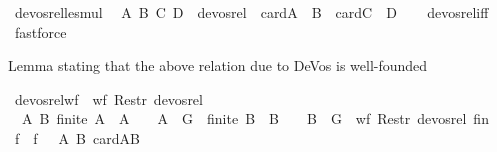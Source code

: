 \begin{isabellebody}
\endisadelimproof
\isanewline
{}\isamarkupfalse%
\ devos{\isacharunderscore}{\kern0pt}rel{\isacharunderscore}{\kern0pt}le{\isacharunderscore}{\kern0pt}smul{\isacharcolon}{\kern0pt}\isanewline
\ \ {\isachardoublequoteopen}{\isacharparenleft}{\kern0pt}{\isacharparenleft}{\kern0pt}A{\isacharcomma}{\kern0pt}\ B{\isacharparenright}{\kern0pt}{\isacharcomma}{\kern0pt}\ {\isacharparenleft}{\kern0pt}C{\isacharcomma}{\kern0pt}\ D{\isacharparenright}{\kern0pt}{\isacharparenright}{\kern0pt}\ {\isasymin}\ devos{\isacharunderscore}{\kern0pt}rel\ {\isasymLongrightarrow}\ card{\isacharparenleft}{\kern0pt}A\ {\isasymcdots}\ B{\isacharparenright}{\kern0pt}\ {\isasymle}\ card{\isacharparenleft}{\kern0pt}C\ {\isasymcdots}\ D{\isacharparenright}{\kern0pt}{\isachardoublequoteclose}\isanewline
%
\isadelimproof
\ \ %
\endisadelimproof
%
\isatagproof
{}\isamarkupfalse%
\ devos{\isacharunderscore}{\kern0pt}rel{\isacharunderscore}{\kern0pt}iff\ \isamarkupfalse%
\ fastforce%
\endisatagproof
{\isafoldproof}%
%
\isadelimproof
%
\endisadelimproof
%
\begin{isamarkuptext}%
Lemma stating that the above relation due to DeVos is well-founded%
\end{isamarkuptext}\isamarkuptrue%
\isamarkupfalse%
\ devos{\isacharunderscore}{\kern0pt}rel{\isacharunderscore}{\kern0pt}wf\ {\isacharcolon}{\kern0pt}\ {\isachardoublequoteopen}wf\ {\isacharparenleft}{\kern0pt}Restr\ devos{\isacharunderscore}{\kern0pt}rel\ \isanewline
\ \ {\isacharbraceleft}{\kern0pt}{\isacharparenleft}{\kern0pt}A{\isacharcomma}{\kern0pt}\ B{\isacharparenright}{\kern0pt}{\isachardot}{\kern0pt}\ finite\ A\ {\isasymand}\ A\ {\isasymnoteq}\ {\isacharbraceleft}{\kern0pt}{\isacharbraceright}{\kern0pt}\ {\isasymand}\ A\ {\isasymsubseteq}\ G\ {\isasymand}\ finite\ B\ {\isasymand}\ B\ {\isasymnoteq}\ {\isacharbraceleft}{\kern0pt}{\isacharbraceright}{\kern0pt}\ {\isasymand}\ B\ {\isasymsubseteq}\ G{\isacharbraceright}{\kern0pt}{\isacharparenright}{\kern0pt}{\isachardoublequoteclose}\ {\isacharparenleft}{\kern0pt}\ {\isachardoublequoteopen}wf\ {\isacharparenleft}{\kern0pt}Restr\ devos{\isacharunderscore}{\kern0pt}rel\ {\isacharquery}{\kern0pt}fin{\isacharparenright}{\kern0pt}{\isachardoublequoteclose}{\isacharparenright}{\kern0pt}\isanewline
%
\isadelimproof
%
\endisadelimproof
%
\isatagproof
{}\isamarkupfalse%
{\isacharminus}{\kern0pt}\isanewline
\ \ \isamarkupfalse%
\ f\ \ {\isachardoublequoteopen}f\ {\isacharequal}{\kern0pt}\ {\isacharparenleft}{\kern0pt}{\isasymlambda}\ {\isacharparenleft}{\kern0pt}A{\isacharcomma}{\kern0pt}\ B{\isacharparenright}{\kern0pt}{\isachardot}{\kern0pt}\ card{\isacharparenleft}{\kern0pt}A{\isasymcdots}B{\isacharparenright}{\kern0pt}{\isacharparenright}{\kern0pt}{\isachardoublequoteclose}\isanewline

\end{isabellebody}

